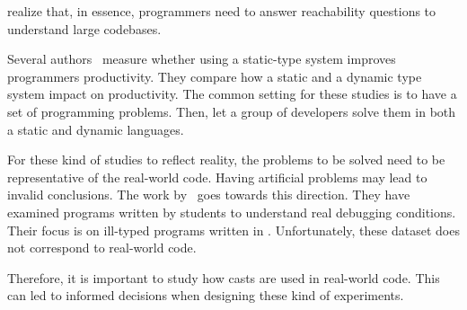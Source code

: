 \cite{latozaDevelopersAskReachability2010} realize that, in essence, programmers need to answer reachability questions to understand large codebases.

Several authors~\cite{stuchlikStaticVsDynamic2011,mayerEmpiricalStudyInfluence2012,harlinImpactUsingStaticType2017} measure whether using a static-type system improves programmers productivity.
They compare how a static and a dynamic type system impact on productivity.
The common setting for these studies is to have a set of programming problems.
Then, let a group of developers solve them in both a static and dynamic languages.

For these kind of studies to reflect reality, the problems to be solved need to be representative of the real-world code.
Having artificial problems may lead to invalid conclusions.
The work by~\cite{wuHowTypeErrors2017,wuLearningUserFriendly2017} goes towards this direction. 
They have examined programs written by students to understand real debugging conditions. 
Their focus is on ill-typed programs written in \haskell{}.
Unfortunately, these dataset does not correspond to real-world code. 

Therefore, it is important to study how casts are used in real-world code. 
This can led to informed decisions when designing these kind of experiments. 
